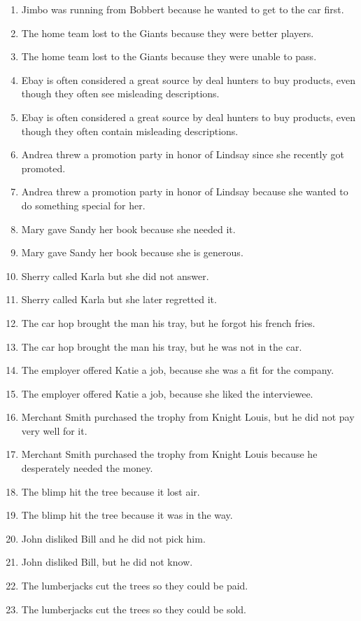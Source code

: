 \documentclass{article}
\begin{document}
\begin{enumerate}
	\item Jimbo was running from Bobbert because he wanted to get to the car first.
	\item The home team lost to the Giants because they were better players.
	\item The home team lost to the Giants because they were unable to pass.
	\item Ebay is often considered a great source by deal hunters to buy products, even though they often see misleading descriptions.
	\item Ebay is often considered a great source by deal hunters to buy products, even though they often contain misleading descriptions.
	\item Andrea threw a promotion party in honor of Lindsay since she recently got promoted.
	\item Andrea threw a promotion party in honor of Lindsay because she wanted to do something special for her.
	\item Mary gave Sandy her book because she needed it.
	\item Mary gave Sandy her book because she is generous.
	\item Sherry called Karla but she did not answer.
	\item Sherry called Karla but she later regretted it.
	\item The car hop brought the man his tray, but he forgot his french fries.
	\item The car hop brought the man his tray, but he was not in the car.
	\item The employer offered Katie a job, because she was a fit for the company.
	\item The employer offered Katie a job, because she liked the interviewee.
	\item Merchant Smith purchased the trophy from Knight Louis, but he did not pay very well for it.
	\item Merchant Smith purchased the trophy from Knight Louis because he desperately needed the money.
	\item The blimp hit the tree because it lost air.
	\item The blimp hit the tree because it was in the way.
	\item John disliked Bill and he did not pick him.
	\item John disliked Bill, but he did not know.
	\item The lumberjacks cut the trees so they could be paid.
	\item The lumberjacks cut the trees so they could be sold.

\end{enumerate}
\end{document}
